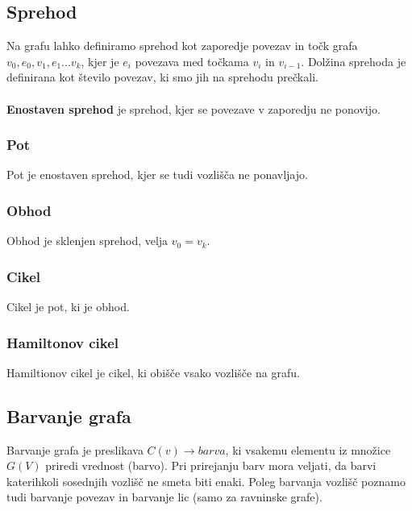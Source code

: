 \documentclass[11pt]{article}
\begin{document}
\subsection{Sprehod}

Na grafu lahko definiramo sprehod kot zaporedje povezav in točk grafa $v_0, e_0, v_1, e_1 ... v_k$, kjer je $e_i$ povezava med točkama $v_i$ in $v_{i-1}$. Dolžina sprehoda je definirana kot število povezav, ki smo jih na sprehodu prečkali.
\\ \\
\textbf{Enostaven sprehod} je sprehod, kjer se povezave v zaporedju ne ponovijo. \cite{studentka}

\subsubsection{Pot}

Pot je enostaven sprehod, kjer se tudi vozlišča ne ponavljajo. \cite{studentka}

\subsubsection{Obhod}

Obhod je sklenjen sprehod, velja $v_0 = v_k$. \cite{studentka}

\subsubsection{Cikel}

Cikel je pot, ki je obhod. \cite{studentka}

\subsubsection{Hamiltonov cikel}

Hamiltionov cikel je cikel, ki obišče vsako vozlišče na grafu. \cite{studentka}

\subsection{Barvanje grafa}

Barvanje grafa je preslikava $C(v) \rightarrow barva$, ki vsakemu elementu iz množice $G(V)$ priredi vrednost (barvo). Pri prirejanju barv mora veljati, da barvi katerihkoli sosednjih vozlišč ne smeta biti enaki. Poleg barvanja vozlišč poznamo tudi barvanje povezav in barvanje lic (samo za ravninske grafe). \cite{studentka, barvanjeWiki}
\end{document}
